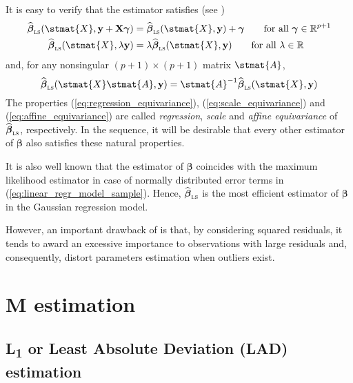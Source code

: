 It is easy to verify that the  estimator satisfies 
(see \citealp[92]{maronna:etal:2006})
%
\begin{align}
    \label{eq:regression_equivariance}
    \sthat{\boldsymbol\beta}_{\stsc{LS}}(\stmat{X},\stvec{y}+\mathbf{X}\boldsymbol\gamma) 
        &= \sthat{\boldsymbol\beta}_{\stsc{LS}}(\stmat{X},\stvec{y})+\boldsymbol\gamma
        \qquad\text{for all $\boldsymbol\gamma\in\mathbb{R}^{p+1}$} \\
    \label{eq:scale_equivariance}
    \sthat{\boldsymbol\beta}_{\stsc{LS}}(\stmat{X},\lambda\stvec{y})
        &= \lambda\sthat{\boldsymbol\beta}_{\stsc{LS}}(\stmat{X}, \stvec{y})
        \qquad\text{for all $\lambda\in\mathbb{R}$}
\end{align}
%
and, for any nonsingular $(p+1) \times (p+1)$ matrix $\stmat{A}$,
%
\begin{equation}\label{eq:affine_equivariance}
    \sthat{\boldsymbol\beta}_{\stsc{LS}}(\stmat{X}\stmat{A},\stvec{y})
    = \stmat{A}^{-1}\sthat{\boldsymbol\beta}_{\stsc{LS}}(\stmat{X},\stvec{y})
\end{equation}
%
The properties (\ref{eq:regression_equivariance}),
(\ref{eq:scale_equivariance}) and (\ref{eq:affine_equivariance}) are called
\emph{regression}, \emph{scale} and \emph{affine equivariance} of
$\sthat{\boldsymbol\beta}_{\stsc{LS}}$, respectively. In the sequence, it will
be desirable that every other estimator of $\boldsymbol\beta$ also satisfies
these natural properties.

It is also well known that the  estimator of $\boldsymbol\beta$ coincides
with the maximum likelihood estimator in case of normally distributed error
terms in (\ref{eq:linear_regr_model_sample}). Hence, $\widehat
{\boldsymbol\beta}_{\stsc{LS}}$ is the most efficient estimator of
$\boldsymbol\beta$ in the Gaussian regression model.

However, an important drawback of  is that, by considering squared
residuals, it tends to award an excessive importance to observations with large
residuals and, consequently, distort parameters estimation when outliers exist.

\section{M estimation}

\subsection{L\textsubscript{1} or Least Absolute Deviation (LAD) estimation}

